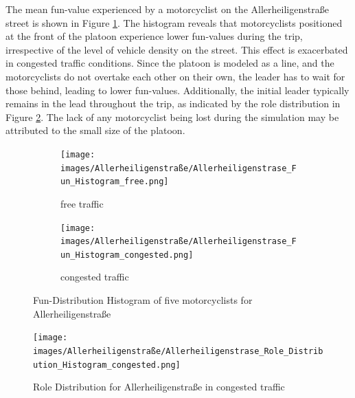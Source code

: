The mean fun-value experienced by a motorcyclist on the Allerheiligenstraße street is shown in Figure \ref{fig:Allerheiligenstraße_fun_histogram}. The histogram reveals that motorcyclists positioned at the front of the platoon experience lower fun-values during the trip, irrespective of the level of vehicle density on the street. This effect is exacerbated in congested traffic conditions. Since the platoon is modeled as a line, and the motorcyclists do not overtake each other on their own, the leader has to wait for those behind, leading to lower fun-values. Additionally, the initial leader typically remains in the lead throughout the trip, as indicated by the role distribution in Figure \ref{fig:Allerheiligenstraß_role_histogram}. The lack of any motorcyclist being lost during the simulation may be attributed to the small size of the platoon.\\

\begin{figure}
     \centering
     \begin{subfigure}[b]{1.0\textwidth}
         \centering
         \texttt{[image: images/Allerheiligenstraße/Allerheiligenstrase\_Fun\_Histogram\_free.png]}
         \caption{free traffic}
     \end{subfigure}
     \hfill
     \begin{subfigure}[b]{1.0\textwidth}
         \centering
         \texttt{[image: images/Allerheiligenstraße/Allerheiligenstrase\_Fun\_Histogram\_congested.png]}
         \caption{congested traffic}
     \end{subfigure}
        \caption{Fun-Distribution Histogram of five motorcyclists for Allerheiligenstraße}
        \label{fig:Allerheiligenstraße_fun_histogram}
\end{figure}

\begin{figure}
\texttt{[image: images/Allerheiligenstraße/Allerheiligenstrase\_Role\_Distribution\_Histogram\_congested.png]}
\caption{Role Distribution for Allerheiligenstraße in congested traffic}
\label{fig:Allerheiligenstraß_role_histogram}
\end{figure}

